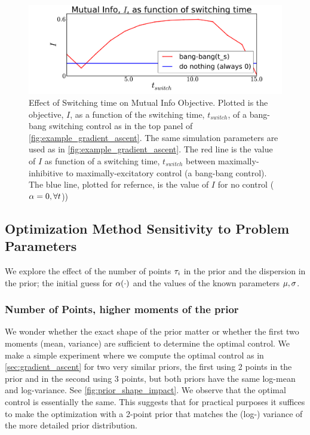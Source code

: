 \documentclass{article}
\begin{document}
\begin{figure}[htp]
\begin{center}
  \includegraphics[width=1\textwidth]{Figs/AdjointOptimizer/SweepSwitchpoint_wide.pdf}
  \caption[Effect of Switching time on Mutual Info Objective]{Effect of
  Switching time on Mutual Info Objective. Plotted is the objective, $I$, as a
  function of the switching time, $t_{switch}$, of a bang-bang switching control
  as in the top panel of \cref{fig:example_gradient_ascent}. The same
  simulation parameters are used as in \cref{fig:example_gradient_ascent}. The
  red line is the value of $I$ as function of a switching time, $t_{switch}$
  between maximally-inhibitive to maximally-excitatory control (a bang-bang
  control). The blue line, plotted for refernce, is the value of
  $I$ for no control (${\alpha}=0, \forall t$))}
  \label{fig:sweep_switchtime}
\end{center}
\end{figure}


\subsection{Optimization Method Sensitivity to Problem Parameters}
We explore the effect of the number of points
${\tau}_i$ in the prior and the dispersion in the prior; the initial
guess for ${\alpha}(\cdot)$ and the values of the known parameters ${\mu }, {\sigma }$. 

\subsubsection{Number of Points, higher moments of the prior}
We wonder whether the exact shape of the prior matter or whether the first two
moments (mean, variance) are sufficient to determine the optimal control. We
make a simple experiment where we compute the optimal control as in
\cref{sec:gradient_ascent} for two very similar priors, the first using 2 points
in the prior and in the second using 3 points, but both priors have the same
log-mean and log-variance. See \cref{fig:prior_shape_impact}. We observe that
the optimal control is essentially the same. This suggests that for practical
purposes it suffices to make the optimization with a 2-point prior that matches
the (log-) variance of the more detailed prior distribution.
 
\end{document}
